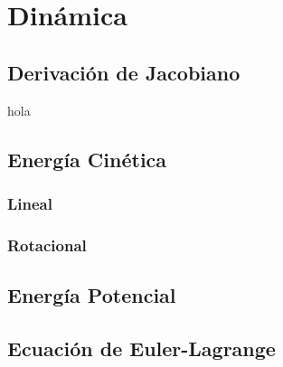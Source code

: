 \chapter{Dinámica}

\section{Derivación de Jacobiano}
hola

\section{Energía Cinética}
\subsection{Lineal}
\subsection{Rotacional}

\section{Energía Potencial}

\section{Ecuación de Euler-Lagrange}